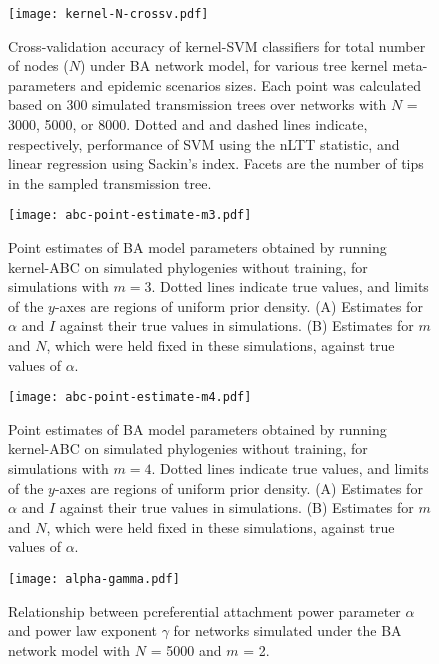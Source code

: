 \documentclass[12pt]{article}\usepackage[]{graphicx}\usepackage[]{color}
\begin{document}
\begin{figure}[ht]
  \centering
  \texttt{[image: kernel-N-crossv.pdf]}
  \caption{Cross-validation accuracy of kernel-SVM classifiers for total number
      of nodes ($N$) under BA network model, for various tree kernel
      meta-parameters and epidemic scenarios sizes. Each point was calculated
      based on 300 simulated transmission trees over networks with $N$ = 3000,
      5000, or 8000. Dotted and and dashed lines indicate, respectively,
      performance of SVM using the nLTT statistic, and linear regression
      using Sackin's index. Facets are the number of tips in the sampled
      transmission tree.
  }
  \label{fig:Ncrossv}
\end{figure}

\begin{figure}[ht]
  \centering
  \texttt{[image: abc-point-estimate-m3.pdf]}
  \caption{
    Point estimates of BA model parameters obtained by running kernel-ABC
    on simulated phylogenies without training, for simulations with $m = 3$.
    Dotted lines indicate true values, and limits of the $y$-axes are regions
    of uniform prior density. (A) Estimates for $\alpha$ and $I$ against their
    true values in simulations. (B) Estimates for $m$ and $N$, which were held
    fixed in these simulations, against true values of $\alpha$.
  }
  \label{fig:abcptm3}
\end{figure}

\begin{figure}[ht]
  \centering
  \texttt{[image: abc-point-estimate-m4.pdf]}
  \caption{
    Point estimates of BA model parameters obtained by running kernel-ABC
    on simulated phylogenies without training, for simulations with $m = 4$.
    Dotted lines indicate true values, and limits of the $y$-axes are regions
    of uniform prior density. (A) Estimates for $\alpha$ and $I$ against their
    true values in simulations. (B) Estimates for $m$ and $N$, which were held
    fixed in these simulations, against true values of $\alpha$.
  }
  \label{fig:abcptm4}
\end{figure}

\begin{figure}[ht]
  \centering
  \texttt{[image: alpha-gamma.pdf]}
  \caption{
      Relationship between pcreferential attachment power parameter $\alpha$
      and power law exponent $\gamma$ for networks simulated under the BA
      network model with $N$ = 5000 and $m$ = 2.
  }
  \label{fig:gamma}
\end{figure}
\end{document}
